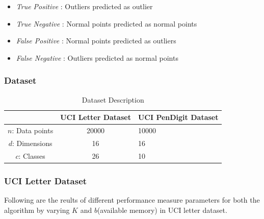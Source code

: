 \begin{itemize}
	
	\item \textit{True Positive} : Outliers  predicted as outlier
	 
	\item \textit{True Negative} : Normal points predicted as normal points
	
	\item \textit{False Positive} : Normal points predicted as outliers
	
	
	\item \textit{False Negative } : Outliers  predicted as normal points
	
	
	
	
\end{itemize}

\subsubsection{Dataset}
\begin{table}[H]
	\centering
	\caption{Dataset Description}
	\label{my-label}
	\begin{tabular}{|c|c|l|}
		\hline
		\multicolumn{1}{|l|}{} & UCI Letter Dataset & UCI PenDigit Dataset \\ \hline
		$n$: Data points         & 20000              & 10000                \\ \hline
		$d$: Dimensions          & 16                 & 16                   \\ \hline
		$c$: Classes             & 26                 & 10                   \\ \hline
	\end{tabular}
\end{table}



\subsubsection{UCI Letter Dataset}

Following are the reults of different performance measure parameters for both the algorithm by varying $K$ and $b$(available memory) in UCI letter dataset. 



